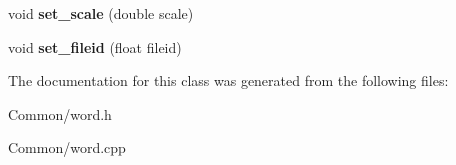 \begin{DoxyCompactItemize}
\item 
\hypertarget{classword_a20204281785c84e008f4e36d24f9bbea}{
void {\bfseries set\_\-scale} (double scale)}
\label{classword_a20204281785c84e008f4e36d24f9bbea}

\item 
\hypertarget{classword_ae38f97ffca326bda276c3ce75eb23dcd}{
void {\bfseries set\_\-fileid} (float fileid)}
\label{classword_ae38f97ffca326bda276c3ce75eb23dcd}

\end{DoxyCompactItemize}


The documentation for this class was generated from the following files:\begin{DoxyCompactItemize}
\item 
Common/word.h\item 
Common/word.cpp\end{DoxyCompactItemize}
